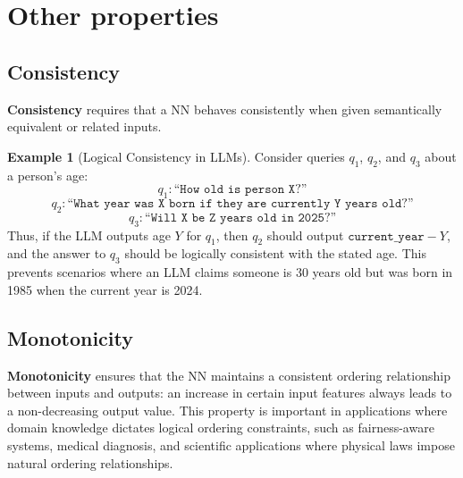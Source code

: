 \documentclass[oneside,11pt,dvipsnames]{book}
\numberwithin{equation}{section}
\theoremstyle{definition}
\newtheorem{example}{Example}[section]
\theoremstyle{remark}
\begin{document}
\section{Other properties}\label{sec:other-properties}

\subsection{Consistency}

\textbf{Consistency} requires that a NN behaves consistently when given semantically equivalent or related inputs.

\begin{example}[Logical Consistency in LLMs] Consider queries $q_1$, $q_2$, and $q_3$ about a person's age:
\[
q_1: \texttt{``How old is person X?''}
\]
\[
q_2: \texttt{``What year was X born if they are currently Y years old?''}
\]
\[
q_3: \texttt{``Will X be Z years old in 2025?''}
\]
Thus, if the LLM outputs age $Y$ for $q_1$, then $q_2$ should output $\texttt{current\_year} - Y$, and the answer to $q_3$ should be logically consistent with the stated age. This prevents scenarios where an LLM claims someone is 30 years old but was born in 1985 when the current year is 2024.
\end{example}




\subsection{Monotonicity}

\textbf{Monotonicity} ensures that the NN maintains a consistent ordering relationship between inputs and outputs: an increase in certain input features always leads to a non-decreasing output value. This property is important in applications where domain knowledge dictates logical ordering constraints, such as fairness-aware systems, medical diagnosis, and scientific applications where physical laws impose natural ordering relationships.
\end{document}
